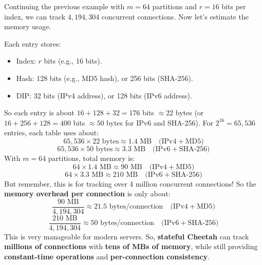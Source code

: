 \begin{examplebox}
    Continuing the previous example with $m=64$ partitions and $r=16$ bits per index, we can track $4,194,304$ concurrent connections. Now let's estimate the memory usage.

    Each  entry stores:
    \begin{itemize}
        \item Index: $r$ bits (e.g., 16 bits).
        \item Hash: 128 bits (e.g., MD5 hash), or 256 bits (SHA-256).
        \item DIP: 32 bits (IPv4 address), or 128 bits (IPv6 address).
    \end{itemize}
    So each entry is about $16 + 128 + 32 = 176$ bits $\approx 22$ bytes (or $16 + 256 + 128 = 400$ bits $\approx 50$ bytes for IPv6 and SHA-256). For $2^{16} = 65,536$ entries, each table uses about:
    \begin{equation*}
        65,536 \times 22 \text{ bytes} \approx 1.4 \text{ MB} \quad \text{(IPv4} + \text{MD5)}
    \end{equation*}
    \begin{equation*}
        65,536 \times 50 \text{ bytes} \approx 3.3 \text{ MB} \quad \text{(IPv6} + \text{SHA-256)}
    \end{equation*}
    With $m=64$ partitions, total memory is:
    \begin{equation*}
        64 \times 1.4 \text{ MB} \approx 90 \text{ MB} \quad \text{(IPv4} + \text{MD5)}
    \end{equation*}
    \begin{equation*}
        64 \times 3.3 \text{ MB} \approx 210 \text{ MB} \quad \text{(IPv6} + \text{SHA-256)}
    \end{equation*}
    But remember, this is for tracking over 4 million concurrent connections! So the \textbf{memory overhead per connection} is only about:
    \begin{equation*}
        \frac{90 \text{ MB}}{4,194,304} \approx 21.5 \text{ bytes/connection} \quad \text{(IPv4} + \text{MD5)}
    \end{equation*}
    \begin{equation*}
        \frac{210 \text{ MB}}{4,194,304} \approx 50 \text{ bytes/connection} \quad \text{(IPv6} + \text{SHA-256)}
    \end{equation*}
    This is very manageable for modern servers. So, \textbf{stateful Cheetah} can track \textbf{millions of connections} with \textbf{tens of MBs of memory}, while still providing \textbf{constant-time operations} and \textbf{per-connection consistency}.
\end{examplebox}

